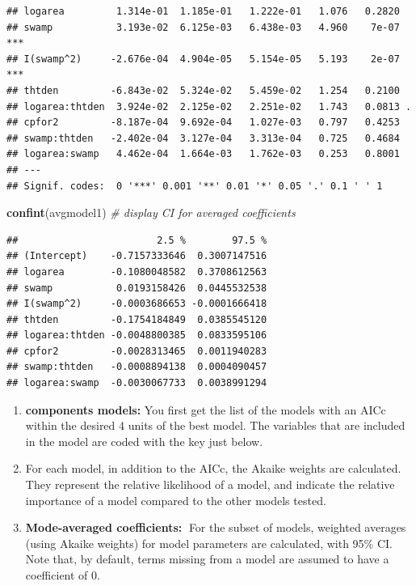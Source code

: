 \documentclass[
  12pt,
]{book}
\newenvironment{Shaded}{\begin{snugshade}}{\end{snugshade}}
\newcommand{\CommentTok}[1]{\textcolor[rgb]{0.56,0.35,0.01}{\textit{#1}}}
\newcommand{\KeywordTok}[1]{\textcolor[rgb]{0.13,0.29,0.53}{\textbf{#1}}}
\newcommand{\NormalTok}[1]{#1}
\providecommand{\tightlist}{%
  \setlength{\itemsep}{0pt}\setlength{\parskip}{0pt}}
\begin{document}
\begin{verbatim}
## logarea         1.314e-01  1.185e-01   1.222e-01   1.076   0.2820    
## swamp           3.193e-02  6.125e-03   6.438e-03   4.960    7e-07 ***
## I(swamp^2)     -2.676e-04  4.904e-05   5.154e-05   5.193    2e-07 ***
## thtden         -6.843e-02  5.324e-02   5.459e-02   1.254   0.2100    
## logarea:thtden  3.924e-02  2.125e-02   2.251e-02   1.743   0.0813 .  
## cpfor2         -8.187e-04  9.692e-04   1.027e-03   0.797   0.4253    
## swamp:thtden   -2.402e-04  3.127e-04   3.313e-04   0.725   0.4684    
## logarea:swamp   4.462e-04  1.664e-03   1.762e-03   0.253   0.8001    
## ---
## Signif. codes:  0 '***' 0.001 '**' 0.01 '*' 0.05 '.' 0.1 ' ' 1
\end{verbatim}

\begin{Shaded}
\begin{Highlighting}[]
\KeywordTok{confint}\NormalTok{(avgmodel1) }\CommentTok{\# display CI for averaged coefficients}
\end{Highlighting}
\end{Shaded}

\begin{verbatim}
##                        2.5 %        97.5 %
## (Intercept)    -0.7157333646  0.3007147516
## logarea        -0.1080048582  0.3708612563
## swamp           0.0193158426  0.0445532538
## I(swamp^2)     -0.0003686653 -0.0001666418
## thtden         -0.1754184849  0.0385545120
## logarea:thtden -0.0048800385  0.0833595106
## cpfor2         -0.0028313465  0.0011940283
## swamp:thtden   -0.0008894138  0.0004090457
## logarea:swamp  -0.0030067733  0.0038991294
\end{verbatim}

\begin{enumerate}
\def\labelenumi{\arabic{enumi}.}
\tightlist
\item
  \textbf{components models:} You first get the list of the models with an AICc within the desired 4 units of the best model. The variables that are included in the model are coded with the key just below.
\item
  For each model, in addition to the AICc, the Akaike weights are calculated. They represent the relative likelihood of a model, and indicate the relative importance of a model compared to the other models tested.
\item
  \textbf{Mode-averaged coefficients:} For the subset of models, weighted averages (using Akaike weights) for model parameters are calculated, with 95\% CI. Note that, by default, terms missing from a model are assumed to have a
  coefficient of 0.
\end{enumerate}
\end{document}
